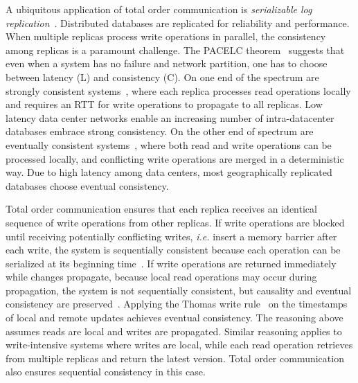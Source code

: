 A ubiquitous application of total order communication is \textit{serializable log replication}~\cite{birman1985replication,petersen1997flexible,belaramani2006practi}. Distributed databases are replicated for reliability and performance. When multiple replicas process write operations in parallel, the consistency among replicas is a paramount challenge. The PACELC theorem~\cite{abadi2012consistency} suggests that even when a system has no failure and network partition, one has to choose between latency (L) and consistency (C). On one end of the spectrum are strongly consistent systems~\cite{kallman2008h,li2012making,corbett2013spanner}, where each replica processes read operations locally and requires an RTT for write operations to propagate to all replicas. Low latency data center networks enable an increasing number of intra-datacenter databases embrace strong consistency. On the other end of spectrum are eventually consistent systems~\cite{terry1995managing,lloyd2011don,lloyd2013stronger}, where both read and write operations can be processed locally, and conflicting write operations are merged in a deterministic way. Due to high latency among data centers, most geographically replicated databases choose eventual consistency.

Total order communication ensures that each replica receives an identical sequence of write operations from other replicas. If write operations are blocked until receiving potentially conflicting writes, \textit{i.e.} insert a memory barrier after each write, the system is sequentially consistent because each operation can be serialized at its beginning time~\cite{lu2016snow}. If write operations are returned immediately while changes propagate, because local read operations may occur during propagation, the system is not sequentially consistent, but causality and eventual consistency are preserved~\cite{terry1995managing}. Applying the Thomas write rule~\cite{thomas1979majority} on the timestamps of local and remote updates achieves eventual consistency. The reasoning above assumes reads are local and writes are propagated. Similar reasoning applies to write-intensive systems where writes are local, while each read operation retrieves from multiple replicas and return the latest version. Total order communication also ensures sequential consistency in this case.

